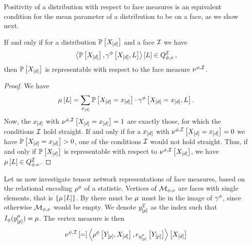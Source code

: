 Positivity of a distribution with respect to face measures is an equivalent condition for the mean parameter of a distribution to be on a face, as we show next.

\begin{theorem}\label{the:facePolytopeCharacterization}
    If and only if for a distribution $\mathbb{P}\left[X_{[d]}\right]$ and a face $\mathcal{I}$ we have
    \begin{align*}
        \left\langle \mathbb{P}\left[X_{[d]}\right],\gamma^{\phi}\left[X_{[d]},L\right]\right\rangle \left[ L \right]\in Q^{\mathcal{I}}_{\phi,\nu}\, ,
    \end{align*}
    then $\mathbb{P}\left[X_{[d]}\right]$ is representable with respect to the face measure $\nu^{\phi,\mathcal{I}}$.
\end{theorem}
\begin{proof}
    We have
    \begin{align*}
        \mu\left[L\right] = \sum_{x_{[d]}} \mathbb{P}\left[X_{[d]}=x_{[d]}\right]\cdot\gamma^{\phi}\left[X_{[d]}=x_{[d]},L\right] .
    \end{align*}
    Now, the $x_{[d]}$ with $\nu^{\phi,\mathcal{I}}\left[X_{[d]}=x_{[d]}\right]=1$ are exactly those, for which the conditions $\mathcal{I}$ hold straight.
    If and only if for a $x_{[d]}$ with $\nu^{\phi,\mathcal{I}}\left[X_{[d]}=x_{[d]}\right]=0$ we have $\mathbb{P}\left[X_{[d]}=x_{[d]}\right]>0$, one of the conditions $\mathcal{I}$ would not hold straight.
    Thus, if and only if $\mathbb{P}\left[X_{[d]}\right]$ is representable with respect to $\nu^{\phi,\mathcal{I}}\left[X_{[d]}\right]$, we have $\mu\left[L\right]\in Q^{\mathcal{I}}_{\phi,\nu}$.
\end{proof}


Let us now investigate tensor network representations of face measures, based on the relational encoding $\rho^{\phi}$ of a statistic.
Vertices of $\mathcal{M}_{\phi,\nu}$ are faces with single elements, that is $\{\mu\left[L\right]\}$.
By  there must be $\mu$ must lie in the image of $\gamma^{\phi}$, since otherwise $\mathcal{M}_{\phi,\nu}$ would be empty.
We denote $y^{\mathcal{I}}_{[p]}$ as the index such that $I_{\phi}(y^{\mu}_{[p]})=\mu$.
The vertex measure is then
\begin{align*}
    \nu^{\phi,\mathcal{I}}\left[=\right] \left\langle \rho^{\phi}\left[Y_{[p]},X_{[d]}\right],e_{y^{\mu}_{[p]}}\left[Y_{[p]}\right]\right\rangle \left[ X_{[d]} \right]
\end{align*}

